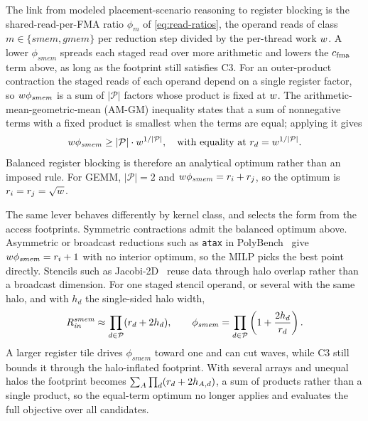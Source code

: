 The link from modeled placement-scenario reasoning to register blocking is the shared-read-per-FMA ratio \(\phi_{m}\) of \autoref{eq:read-ratios}, the operand reads of class \(m\in\{\mathit{smem},\mathit{gmem}\}\) per reduction step divided by the per-thread work \(w\). A lower \(\phi_{\mathit{smem}}\) spreads each staged read over more arithmetic and lowers the \(c_{\mathrm{fma}}\) term above, as long as the footprint still satisfies C3. For an outer-product contraction the staged reads of each operand depend on a single register factor, so \(w\phi_{\mathit{smem}}\) is a sum of \(|\mathcal{P}|\) factors whose product is fixed at \(w\). The arithmetic-mean-geometric-mean (AM-GM) inequality states that a sum of nonnegative terms with a fixed product is smallest when the terms are equal; applying it gives
\[
w\phi_{\mathit{smem}} \ge |\mathcal{P}| \cdot w^{1/|\mathcal{P}|},
\quad \text{with equality at } r_d=w^{1/|\mathcal{P}|}.
\]
Balanced register blocking is therefore an analytical optimum rather than an imposed rule. For GEMM, \(|\mathcal{P}|=2\) and \(w\phi_{\mathit{smem}}=r_i+r_j\), so the optimum is \(r_i=r_j=\sqrt{w}\).

The same lever behaves differently by kernel class, and \name selects the form from the access footprints. Symmetric contractions admit the balanced optimum above. Asymmetric or broadcast reductions such as \texttt{atax} in PolyBench~\cite{polybench} give \(w\phi_{\mathit{smem}}=r_i+1\) with no interior optimum, so the MILP picks the best point directly. Stencils such as Jacobi-2D~\cite{polybench} reuse data through halo overlap rather than a broadcast dimension. For one staged stencil operand, or several with the same halo, and with \(h_d\) the single-sided halo width,
\begin{equation}
\begin{aligned}
R^{\mathit{smem}}_{\mathit{in}}
\approx \prod_{d\in\mathcal{P}}(r_d+2h_d),
\qquad
\phi_{\mathit{smem}}
= \prod_{d\in\mathcal{P}}\left(1+\frac{2h_d}{r_d}\right).
\end{aligned}
\label{eq:stencil-halo}
\end{equation}
A larger register tile drives \(\phi_{\mathit{smem}}\) toward one and can cut waves, while C3 still bounds it through the halo-inflated footprint. With several arrays and unequal halos the footprint becomes \(\sum_A\prod_d(r_d+2h_{A,d})\), a sum of products rather than a single product, so the equal-term optimum no longer applies and \name evaluates the full objective over all candidates.

